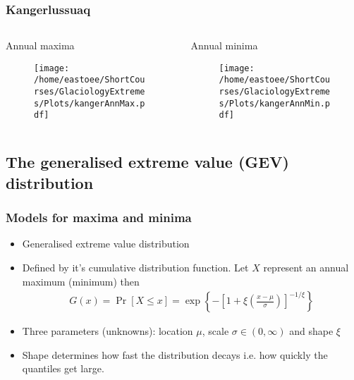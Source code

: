 \documentclass[dvipsnames]{beamer}
\begin{document}
\begin{frame}
\frametitle{Kangerlussuaq}

\begin{columns}[T]
\begin{column}{0.5\textwidth}
\vfill
Annual maxima
\begin{figure}
\centering
{\texttt{[image: /home/eastoee/ShortCourses/GlaciologyExtremes/Plots/kangerAnnMax.pdf]}}
\end{figure}
\vfill
\end{column}
\hfill
\begin{column}{0.5\textwidth}
Annual minima
\begin{figure}
\centering
{\texttt{[image: /home/eastoee/ShortCourses/GlaciologyExtremes/Plots/kangerAnnMin.pdf]}}
\end{figure}
\end{column}
\end{columns}
\end{frame}

\subsection{The generalised extreme value (GEV) distribution}
\begin{frame}
\frametitle{Models for maxima and minima}
\begin{itemize}
\item
Generalised extreme value distribution
\item
Defined by it's cumulative distribution function. Let $X$ represent an annual maximum (minimum) then
\begin{eqnarray*}
G(x)=\Pr[X\leq x]=\exp\left\{-\left[1+\xi\left(\frac{x-\mu}{\sigma}\right)\right]^{-1/\xi}\right\}
\end{eqnarray*}
\item
Three parameters (unknowns): location $\mu$, scale $\sigma\in(0,\infty)$ and shape $\xi$
\item
Shape determines how fast the distribution decays i.e. how quickly the quantiles get large. 
\end{itemize}

\end{frame}
\end{document}
